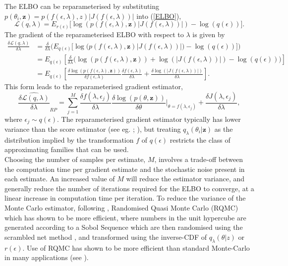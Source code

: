 \documentclass[12pt,a4paper]{article}\usepackage[]{graphicx}\usepackage[]{color}
\begin{document}
The ELBO can be reparameterised by substituting $p(\theta_i, \textbf{z}) = p(f(\epsilon, \lambda), z)|J(f(\epsilon, \lambda))|$ into (\ref{ELBO}),
\begin{equation}
\label{rpELBO}
\mathcal{L}(q, \lambda) = E_{r(\epsilon)} \bigg[\log(p(f(\epsilon,\lambda), \textbf{z})|J(f(\epsilon, \lambda))|) - \log(q(\epsilon))\bigg].
\end{equation}
The gradient of the reparameterised ELBO with respect to $\lambda$ is given by 
\begin{align}
\label{rpELBODeriv}
\frac{\delta\mathcal{L}(q, \lambda)}{\delta \lambda} &= \frac{\delta}{\delta \lambda} \bigg( E_{q(\epsilon)} \bigg[\log\big(p(f(\epsilon,\lambda), \textbf{z})|J(f(\epsilon, \lambda))|\big) - \log(q(\epsilon))\bigg] \bigg) \nonumber \\
&= E_{q(\epsilon)} \left[ \frac{\delta}{\delta \lambda} \bigg(\log(p(f(\epsilon,\lambda), \textbf{z})) + \log(|J(f(\epsilon, \lambda))|) - \log(q(\epsilon)) \bigg)\right] \nonumber \\
&= E_{q(\epsilon)} \left[ \frac{\delta \log(p(f(\epsilon,\lambda), \textbf{z}))}{\delta f(\epsilon,\lambda)} \frac{\delta f(\epsilon,\lambda)}{\delta \lambda}  + \frac{\delta \log(|J(f(\epsilon, \lambda))|)}{\delta \lambda} \right].
\end{align}
This form leads to the reparameterised gradient estimator,
\begin{equation}
\label{rpDeriv}
\widehat{\frac{\delta\mathcal{L}(q, \lambda)}{\delta \lambda}}_{RP} = \sum_{j = 1}^M \frac{\delta f(\lambda, \epsilon_j)}{\delta \lambda} \frac{\delta \log(p(\theta, \textbf{z}))}{\delta \theta} \bigg\rvert_{\theta = f(\lambda, \epsilon_j)} + \frac{\delta J(\lambda, \epsilon_j)}{\delta \lambda}, 
\end{equation}
where $\epsilon_j \sim q(\epsilon)$. The reparameterised gradient estimator typically has lower variance than the score estimator (see eg. \cite{Rezende2014}; \cite{Ruiz2016}), but treating $q_{\lambda}(\theta_i | \textbf{z})$ as the distribution implied by the transformation $f$ of $q(\epsilon)$ restricts the class of approximating families that can be used.
\\

Choosing the number of samples per estimate, $M$, involves a trade-off between the computation time per gradient estimate and the stochastic noise present in each estimate. An increased value of $M$ will reduce the estimator variance, and generally reduce the number of iterations required for the ELBO to converge, at a linear increase in computation time per iteration. To reduce the variance of the Monte Carlo estimator, following \citet{Gunawan2017}, Randomised Quasi Monte Carlo (RQMC) which has shown to be more efficient, where numbers in the unit hypercube are generated according to a Sobol Sequence \citep{Sobol1967} which are then randomised using the scrambled net method \citep{Matousek1998}, and transformed using the inverse-CDF of $q_{\lambda}(\theta | z)$ or $r(\epsilon)$. Use of RQMC has shown to be more efficient than standard Monte-Carlo in many applications (see \cite{Niederreiter1992, Caflisch1998}).
\end{document}
